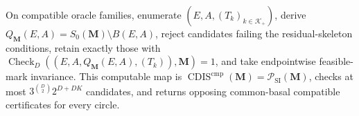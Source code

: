 On compatible oracle families, enumerate \((E,A,(T_k)_{k\in\mathcal K_+})\), derive \(Q_{\mathbf M}(E,A)=S_0(\mathbf M)\setminus B(E,A)\), reject candidates failing the residual-skeleton conditions, retain exactly those with \(\operatorname{Check}_{D}((E,A,Q_{\mathbf M}(E,A),(T_k)),\mathbf M)=1\), and take endpointwise feasible-mark invariance.  This computable map is \(\operatorname{CDIS}^{\mathrm{cmp}}(\mathbf M)=\mathcal P_{\mathrm{SI}}(\mathbf M)\), checks at most \(3^{\binom D2}2^{D+DK}\) candidates, and returns opposing common-basal compatible certificates for every circle.